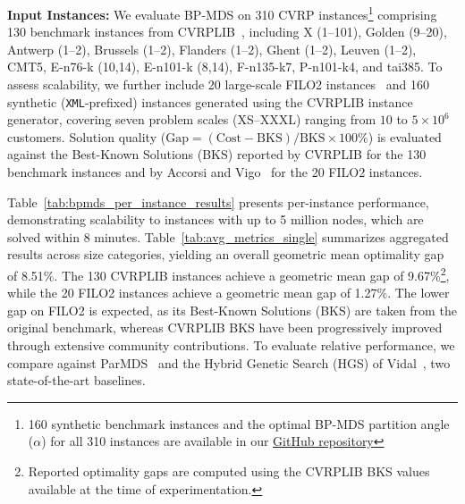 \textbf{Input Instances:} We evaluate BP-MDS on 310 CVRP instances\footnote{\label{fn:github}160 synthetic benchmark instances and the optimal BP-MDS partition angle ($\alpha$) for all 310 instances are available in our \href{https://github.com/CodeCraftsmanSandeep/BP-MDS}{GitHub repository}} comprising 130 benchmark instances from CVRPLIB~\cite{Uchoa_CVRPLIB,CVRPLIB}, including X (1--101), Golden (9--20), Antwerp (1--2), Brussels (1--2), Flanders (1--2), Ghent (1--2), Leuven (1--2), CMT5, E-n76-k (10,14), E-n101-k (8,14), F-n135-k7, P-n101-k4, and tai385. To assess scalability, we further include 20 large-scale FILO2 instances~\cite{FILO2} and 160 synthetic (\texttt{XML}-prefixed) instances generated using the CVRPLIB instance generator, covering seven problem scales (XS--XXXL) ranging from $10$ to $5\times10^{6}$ customers. Solution quality ($\mathrm{Gap}=(\mathrm{Cost}-\mathrm{BKS})/\mathrm{BKS}\times 100\%$) is evaluated against the Best-Known Solutions (BKS) reported by CVRPLIB for the 130 benchmark instances and by Accorsi and Vigo~\cite{FILO2} for the 20 FILO2 instances.


Table~\ref{tab:bpmds_per_instance_results} presents per-instance performance, demonstrating scalability to instances with up to 5 million nodes, which are solved within 8 minutes. Table~\ref{tab:avg_metrics_single} summarizes aggregated results across size categories, yielding an overall geometric mean optimality gap of 8.51\%. The 130 CVRPLIB instances achieve a geometric mean gap of 9.67\%\footnote{Reported optimality gaps are computed using the CVRPLIB BKS values available at the time of experimentation.}, while the 20 FILO2 instances achieve a geometric mean gap of 1.27\%. The lower gap on FILO2 is expected, as its Best-Known Solutions (BKS) are taken from the original benchmark, whereas CVRPLIB BKS have been progressively improved through extensive community contributions. To evaluate relative performance, we compare against ParMDS~\cite{Muniasamy_VRP} and the Hybrid Genetic Search (HGS) of Vidal~\cite{vidal2022hybrid}, two state-of-the-art baselines.

